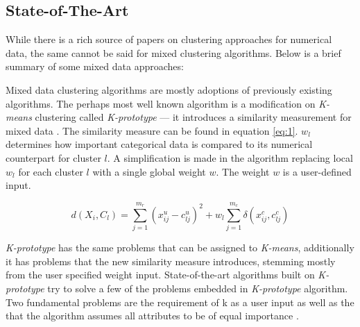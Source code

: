 \documentclass[a4paper,11pt]{article}
\begin{document}


\subsection{State-of-The-Art}
While there is a rich source of papers on clustering approaches for numerical data, the same cannot be said for mixed clustering algorithms. Below is a brief summary of some mixed data approaches:

Mixed data clustering algorithms are mostly adoptions of previously existing algorithms. The perhaps most well known algorithm is a modification on \textit{K-means} clustering called \textit{K-prototype} \cite{Huang97clusteringlarge} --- it introduces a similarity measurement for mixed data . The similarity measure can be found in equation \ref{eq:1}. $w_l$ determines how important categorical data is compared to its numerical counterpart for cluster $l$. A simplification is made in the algorithm replacing local $w_l$ for each cluster $l$ with a single global weight $w$. The weight $w$ is a user-defined input.

\begin{equation}
\label{eq:1}
d(X_i, C_l) = \sum_{j=1}^{m_r}( x_{ij}^{u} - c_{lj}^{u} )^2 +
  w_l \sum_{j=1}^{m_c}\delta( x_{ij}^c, c_{lj}^c )
\end{equation}




\textit{K-prototype} has the same problems that can be assigned to \textit{K-means}, additionally it has problems that the new similarity measure introduces, stemming mostly from the user specified weight input. State-of-the-art algorithms built on \textit{K-prototype} try to solve a few of the problems embedded in \textit{K-prototype} algorithm. Two fundamental problems are the requirement of k as a user input as well as the that the algorithm assumes all attributes to be of equal importance \cite{CHEUNG20132228}\cite{huang2005automated}.
\end{document}
